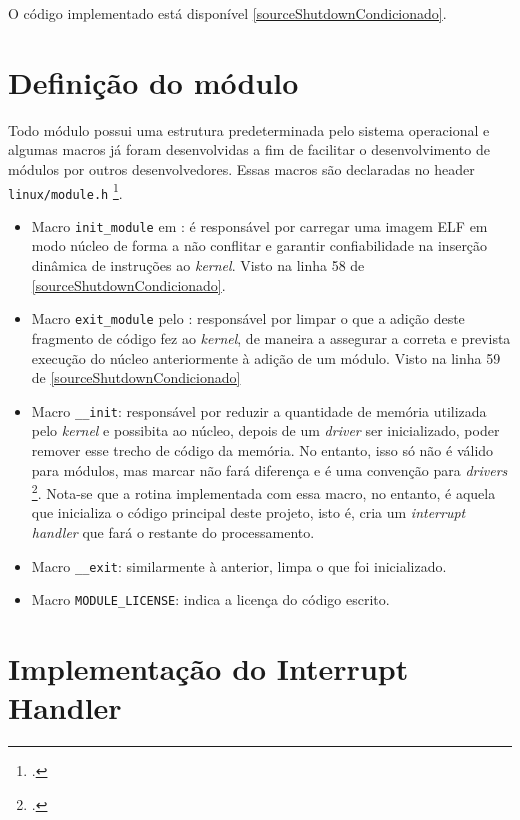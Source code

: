 \documentclass[
	12pt,			
	openright,			%
	twoside,			%
	a4paper,			%
	english,			%
	brazil,				%
	]{abntex2}
\begin{document}
O código implementado está disponível \autoref{sourceShutdownCondicionado}.

\section{Definição do módulo}

Todo módulo possui uma estrutura predeterminada pelo sistema operacional e
algumas macros já foram desenvolvidas a fim de facilitar o desenvolvimento de
módulos por outros desenvolvedores. Essas macros são declaradas no header
\texttt{linux/module.h} \footcite{LinuxModuleDocumentation}.

\begin{itemize}
  \item Macro \lstinline{init_module} em \textcite{initmoduleman}: é responsável por
    carregar uma imagem ELF em modo núcleo de forma a não conflitar e garantir
    confiabilidade na inserção dinâmica de instruções ao \emph{kernel}. Visto na
    linha 58 de \autoref{sourceShutdownCondicionado}.

  \item{Macro \lstinline{exit_module} pelo \textcite{LinuxDeviceDrivers}: responsável
    por limpar o que a adição deste fragmento de código fez ao \emph{kernel}, de
    maneira a assegurar a correta e prevista execução do núcleo anteriormente à
    adição de um módulo. Visto na linha 59 de \autoref{sourceShutdownCondicionado}}

  \item{Macro \lstinline{__init}: responsável por reduzir a quantidade de
    memória utilizada pelo \emph{kernel} e possibita ao núcleo, depois de um
    \emph{driver} ser inicializado, poder remover esse trecho de código da
    memória. No entanto, isso só não é válido para módulos, mas marcar não fará
    diferença e é uma convenção para \emph{drivers}
    \footcite{LinuxDeviceDrivers}. Nota-se que a rotina
    implementada com essa macro, no entanto, é aquela que inicializa o código
    principal deste projeto, isto é, cria um \emph{interrupt handler} que fará o
    restante do processamento}.

  \item Macro \lstinline{__exit}: similarmente à anterior, limpa o que foi
    inicializado.

  \item Macro \lstinline{MODULE_LICENSE}: indica a licença do código escrito.
\end{itemize}

\section{Implementação do Interrupt Handler}
\end{document}

